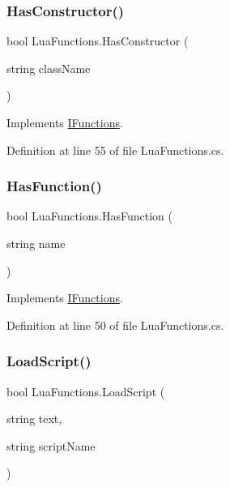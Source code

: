\subsubsection{\texorpdfstring{Has\+Constructor()}{HasConstructor()}}
{\footnotesize\ttfamily bool Lua\+Functions.\+Has\+Constructor (\begin{DoxyParamCaption}\item[{string}]{class\+Name }\end{DoxyParamCaption})}



Implements \hyperlink{interface_i_functions_a41edac00a2af1290932ae95536f987f9}{I\+Functions}.



Definition at line 55 of file Lua\+Functions.\+cs.

\mbox{\label{class_lua_functions_a1bcc0469b7501e9e949e0575aba7fb80}} 
\subsubsection{\texorpdfstring{Has\+Function()}{HasFunction()}}
{\footnotesize\ttfamily bool Lua\+Functions.\+Has\+Function (\begin{DoxyParamCaption}\item[{string}]{name }\end{DoxyParamCaption})}



Implements \hyperlink{interface_i_functions_a55a472175a59db8ec3b00c5dad20cf20}{I\+Functions}.



Definition at line 50 of file Lua\+Functions.\+cs.

\mbox{\label{class_lua_functions_af17a439c6a875a777b9b2e5bc3f5c072}} 
\subsubsection{\texorpdfstring{Load\+Script()}{LoadScript()}}
{\footnotesize\ttfamily bool Lua\+Functions.\+Load\+Script (\begin{DoxyParamCaption}\item[{string}]{text,  }\item[{string}]{script\+Name }\end{DoxyParamCaption})}



